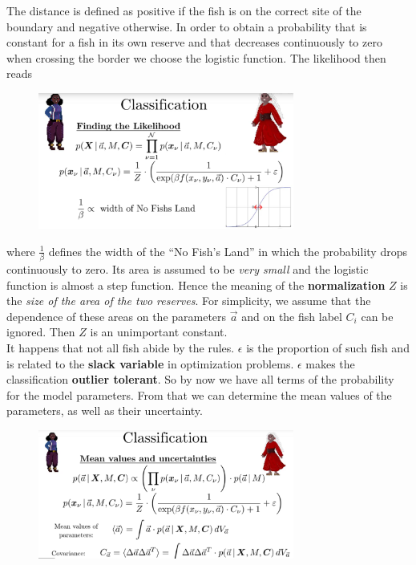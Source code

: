 \documentclass[12pt, a4paper]{scrartcl}
\begin{document}
The distance is defined as positive if the fish is on the correct site of the boundary and negative otherwise.
In order to obtain a probability that is constant for a fish in its own reserve and that decreases continuously to zero when crossing the border we choose the logistic function.
The likelihood then reads%
\begin{figure}[H]
	\centering
	\includegraphics[width=0.75\textwidth]{7_14.png}
\end{figure}
where $\frac {1}{\beta}$ defines the width of the ``No Fish’s Land'' in which the probability
drops continuously to zero. 
Its area is assumed to be \textit{very small} and the logistic function is almost a step function. 
Hence the meaning of the \textbf{normalization} $Z$ is the \textit{size of the area of the two reserves}. For simplicity, we assume that the dependence of these areas on the parameters $\vec{a}$ and on the fish label $C_i$ can be ignored.
Then $Z$ is an unimportant constant.\\
It happens that not all fish abide by the rules. $\epsilon$ is the proportion of such fish and is related to the \textbf{slack variable}
in optimization problems. 
$\epsilon$ makes the classification \textbf{outlier tolerant}.
So by now we have all terms of the probability for the model parameters.
From that we can determine the mean values of the parameters, as well as their uncertainty. %
\begin{figure}[H]
	\centering
	\includegraphics[width=0.75\textwidth]{7_15.png}
\end{figure}
\end{document}
